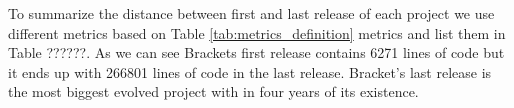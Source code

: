 \par
To summarize the distance between first and last release of each project we use different metrics based on Table \ref{tab:metrics_definition} metrics and list them in Table ??????. 
As we can see Brackets first release contains 6271 lines of code but it ends up with 266801 lines of code in the last release. Bracket's last release is the most biggest evolved project with in four years of its existence.